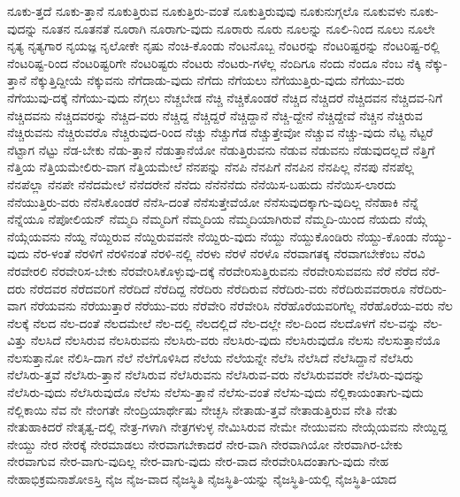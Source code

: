 {ನೂಕು-ತ್ತದೆ
ನೂಕು-ತ್ತಾನೆ
ನೂಕುತ್ತಿರುವ
ನೂಕುತ್ತಿರು-ವಂತೆ
ನೂಕುತ್ತಿರುವುವು
ನೂಕುನುಗ್ಗಲೊ
ನೂಕುವಳು
ನೂಕು-ವುದನ್ನು
ನೂತನ
ನೂತನತೆ
ನೂರಾಗಿ
ನೂರಾಗು-ವುದು
ನೂರಾರು
ನೂರು
ನೂಲನ್ನು
ನೂಲಿ-ನಿಂದ
ನೂಲು
ನೂಲೇ
ನೃತ್ಯ
ನೃತ್ಯಗಾರ
ನೃಯಜ್ಞ
ನೃಲೋಕೇ
ನೃಷು
ನೆಂಚಿ-ಕೊಂಡು
ನೆಂಟನೊಬ್ಬ
ನೆಂಟರನ್ನು
ನೆಂಟರಿಷ್ಟರನ್ನು
ನೆಂಟರಿಷ್ಟ-ರಲ್ಲಿ
ನೆಂಟರಿಷ್ಟ-ರಿಂದ
ನೆಂಟರಿಷ್ಟರಿಗೇ
ನೆಂಟರಿಷ್ಟರು
ನೆಂಟರು
ನೆಂಟರು-ಗಳೆಲ್ಲ
ನೆಂದಿಗೂ
ನೆಂದು
ನೆಂದೂ
ನೆಂಬ
ನೆಕ್ಕಿ
ನೆಕ್ಕು-ತ್ತಾನೆ
ನೆಕ್ಕುತ್ತಿದ್ದೀಯೆ
ನೆಕ್ಕುವನು
ನೆಗೆದಾಡು-ವುದು
ನೆಗೆದು
ನೆಗೆಯಲು
ನೆಗೆಯುತ್ತಿರು-ವುದು
ನೆಗೆಯು-ವರು
ನೆಗೆಯುವು-ದಕ್ಕೆ
ನೆಗೆಯು-ವುದು
ನೆಗ್ಗಲು
ನೆಚ್ಚಬೇಡ
ನೆಚ್ಚಿ
ನೆಚ್ಚಿಕೊಂಡರೆ
ನೆಚ್ಚಿದ
ನೆಚ್ಚಿದರೆ
ನೆಚ್ಚಿದವನ
ನೆಚ್ಚಿದವ-ನಿಗೆ
ನೆಚ್ಚಿದವನು
ನೆಚ್ಚಿದವರನ್ನು
ನೆಚ್ಚಿದ-ವರು
ನೆಚ್ಚಿದ್ದ
ನೆಚ್ಚಿದ್ದರೆ
ನೆಚ್ಚಿದ್ದಾನೆ
ನೆಚ್ಚಿ-ದ್ದೇನೆ
ನೆಚ್ಚಿದ್ದೇವೆ
ನೆಚ್ಚಿನ
ನೆಚ್ಚಿರುವ
ನೆಚ್ಚಿರುವನು
ನೆಚ್ಚಿರುವರೊ
ನೆಚ್ಚಿರುವುದ-ರಿಂದ
ನೆಚ್ಚು
ನೆಚ್ಚುಗೆಡ
ನೆಚ್ಚುತ್ತೇವೋ
ನೆಚ್ಚುವ
ನೆಚ್ಚು-ವುದು
ನೆಟ್ಟ
ನೆಟ್ಟರೆ
ನೆಟ್ಟಾಗ
ನೆಟ್ಟು
ನೆಡ-ಬೇಕು
ನೆಡು-ತ್ತಾನೆ
ನೆಡುತ್ತಾನೆಯೋ
ನೆಡುತ್ತಿರುವನು
ನೆಡುವ
ನೆಡುವನು
ನೆಡುವುದಲ್ಲದೆ
ನೆತ್ತಿಗೆ
ನೆತ್ತಿಯ
ನೆತ್ತಿಯಮೇಲಿರು-ವಾಗ
ನೆತ್ತಿಯಮೇಲೆ
ನೆನಪನ್ನು
ನೆನಪಿ
ನೆನಪಿಗೆ
ನೆನಪಿನ
ನೆನಪಿಲ್ಲ
ನೆನಪು
ನೆನಪೆಲ್ಲ
ನೆನಪೆಲ್ಲಾ
ನೆನಪೇ
ನೆನೆದಮೇಲೆ
ನೆನೆದರೇನೆ
ನೆನೆದು
ನೆನೆನೆನೆದು
ನೆನೆಯಿಸ-ಬಹುದು
ನೆನೆಯಿಸ-ಲಾರದು
ನೆನೆಯುತ್ತಿರು-ವರು
ನೆನೆಸಿಕೊಂಡರೆ
ನೆನೆಸಿ-ದಂತೆ
ನೆನೆಸುತ್ತೇವೆಯೋ
ನೆನೆಸುವುದಕ್ಕಾಗು-ವುದಿಲ್ಲ
ನೆನೆಹಾಕಿ
ನೆನ್ನೆ
ನೆನ್ನೆಯೂ
ನೆಪೋಲಿಯನ್
ನೆಮ್ಮದಿ
ನೆಮ್ಮದಿಗೆ
ನೆಮ್ಮದಿಯ
ನೆಮ್ಮದಿಯಾಗಿರುವೆ
ನೆಮ್ಮದಿ-ಯಿಂದ
ನೆಯದು
ನೆಯ್ಗೆ
ನೆಯ್ಗೆಯವನು
ನೆಯ್ದ
ನೆಯ್ದಿರುವ
ನೆಯ್ದಿರುವವನೇ
ನೆಯ್ದಿರು-ವುದು
ನೆಯ್ದು
ನೆಯ್ದುಕೊಂಡಿರು
ನೆಯ್ದು-ಕೊಂಡು
ನೆಯ್ಯು-ವುದು
ನೆರ-ಳಂತೆ
ನೆರಳಿಗೆ
ನೆರಳಿನಂತೆ
ನೆರಳಿ-ನಲ್ಲಿ
ನೆರಳು
ನೆರಳೆ
ನೆರಳೊ
ನೆರವಾಗತಕ್ಕ
ನೆರವಾಗಬೇಕೆಂಬ
ನೆರವಿ
ನೆರವೇರಲಿ
ನೆರವೇರಿಸ-ಬೇಕು
ನೆರವೇರಿಸಿಕೊಳ್ಳುವು-ದಕ್ಕೆ
ನೆರವೇರಿಸುತ್ತಿರುವನು
ನೆರವೇರಿಸುವವನು
ನೆರೆ
ನೆರೆದ
ನೆರೆ-ದರು
ನೆರೆದವರ
ನೆರೆದವರಿಗೆ
ನೆರೆದಿದೆ
ನೆರೆದಿದ್ದ
ನೆರೆದಿರು
ನೆರೆದಿರುವ
ನೆರೆದಿರು-ವರು
ನೆರೆದಿರುವವರಾರೂ
ನೆರೆದಿರು-ವಾಗ
ನೆರೆಯವನು
ನೆರೆಯುತ್ತಾರೆ
ನೆರೆಯು-ವರು
ನೆರೆವೇರಿ
ನೆರೆವೇರಿಸಿ
ನೆರೆಹೊರೆಯವರಿಗೆಲ್ಲ
ನೆರೆಹೊರೆಯ-ವರು
ನೆಲ
ನೆಲಕ್ಕೆ
ನೆಲದ
ನೆಲ-ದಂತೆ
ನೆಲದಮೇಲೆ
ನೆಲ-ದಲ್ಲಿ
ನೆಲದಲ್ಲಿದೆ
ನೆಲ-ದಲ್ಲೇ
ನೆಲ-ದಿಂದ
ನೆಲದೊಳಗೆ
ನೆಲ-ವನ್ನು
ನೆಲ-ವಿತ್ತು
ನೆಲಸಿದೆ
ನೆಲಸಿರುವ
ನೆಲಸಿರುವನು
ನೆಲಸಿರು-ವರು
ನೆಲಸಿರು-ವುದು
ನೆಲಸಿರುವುದೊ
ನೆಲಸು
ನೆಲಸುತ್ತಾನೆಯೊ
ನೆಲಸುತ್ತಾನೋ
ನೆಲಿಸಿ-ದಾಗ
ನೆಲೆ
ನೆಲೆಗೊಳಿಸಿದ
ನೆಲೆಯ
ನೆಲೆಯನ್ನೇ
ನೆಲೆಸಿ
ನೆಲೆಸಿದೆ
ನೆಲೆಸಿದ್ದಾನೆ
ನೆಲೆಸಿರು
ನೆಲೆಸಿರು-ತ್ತವೆ
ನೆಲೆಸಿರು-ತ್ತಾನೆ
ನೆಲೆಸಿರುವ
ನೆಲೆಸಿರುವನು
ನೆಲೆಸಿರುವ-ವರು
ನೆಲೆಸಿರುವವರೇ
ನೆಲೆಸಿರು-ವುದನ್ನು
ನೆಲೆಸಿರು-ವುದು
ನೆಲೆಸಿರುವುದೊ
ನೆಲೆಸು
ನೆಲೆಸು-ತ್ತಾನೆ
ನೆಲೆಸು-ವಂತೆ
ನೆಲೆಸು-ವುದು
ನೆಲ್ಲಿಕಾಯಂತಾಗು-ವುದು
ನೆಲ್ಲಿಕಾಯಿ
ನೆವ
ನೇ
ನೇಂಗತೇ
ನೇಂದ್ರಿಯಾರ್ಥೇಷು
ನೇಚ್ಛಸಿ
ನೇತಾಡು-ತ್ತವೆ
ನೇತಾಡುತ್ತಿರುವ
ನೇತಿ
ನೇತು
ನೇತುಹಾಕಿದರೆ
ನೇತೃತ್ವ-ದಲ್ಲಿ
ನೇತ್ರ-ಗಳಾಗಿ
ನೇತ್ರಗಳುಳ್ಳ
ನೇಮಿಸಿರುವ
ನೇಮೇ
ನೇಯುವನು
ನೇಯ್ಗೆಯವನು
ನೇಯ್ದಿದ್ದ
ನೇಯ್ದು
ನೇರ
ನೇರಕ್ಕೆ
ನೇರಮಾಡಲು
ನೇರವಾಗಬೇಕಾದರೆ
ನೇರ-ವಾಗಿ
ನೇರವಾಗಿಯೋ
ನೇರವಾಗಿರ-ಬೇಕು
ನೇರವಾಗುವ
ನೇರ-ವಾಗು-ವುದಿಲ್ಲ
ನೇರ-ವಾಗು-ವುದು
ನೇರ-ವಾದ
ನೇರವೇರಿಸಿದಂತಾಗು-ವುದು
ನೇಹ
ನೇಹಾಭಿಕ್ರಮನಾಶೋಽಸ್ತಿ
ನೈಜ
ನೈಜ-ವಾದ
ನೈಜಸ್ಥಿತಿ
ನೈಜಸ್ಥಿತಿ-ಯನ್ನು
ನೈಜಸ್ಥಿತಿ-ಯಲ್ಲಿ
ನೈಜಸ್ಥಿತಿ-ಯಾದ
}

